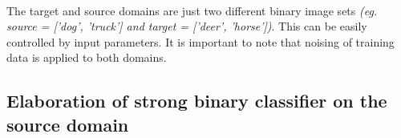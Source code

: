 \documentclass[11 pt]{article}
\begin{document}
\paragraph{}The target and source domains are just two different binary image sets \textit{(eg. source = ['dog', 'truck'] and target = ['deer', 'horse'])}. This can be easily controlled by input parameters. It is important to note that noising of training data is applied to both domains.


\subsection{Elaboration of strong binary classifier on the source domain}

\end{document}
